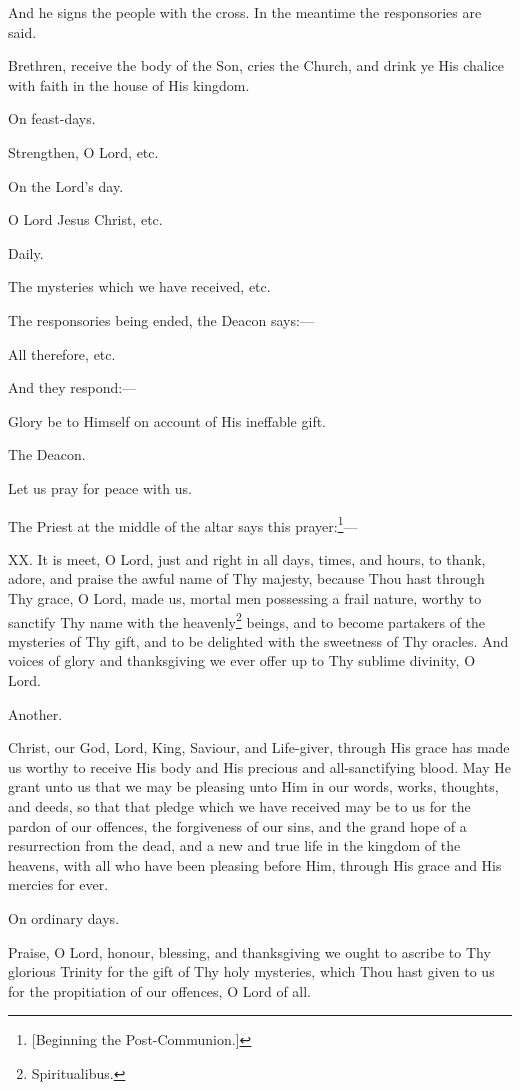 And he signs the people with the cross. In the meantime the responsories are said.

Brethren, receive the body of the Son, cries the Church, and drink ye His chalice with faith in the house of His kingdom.

On feast-days.

Strengthen, O Lord, etc.

On the Lord’s day.

O Lord Jesus Christ, etc.

Daily.

The mysteries which we have received, etc.

The responsories being ended, the Deacon says:—

All therefore, etc.

And they respond:—

Glory be to Himself on account of His ineffable gift.

The Deacon.

Let us pray for peace with us.

The Priest at the middle of the altar says this prayer:\footnote{\par{}  [Beginning the Post-Communion.]}—

XX. It is meet, O Lord, just and right in all days, times, and hours, to thank, adore, and praise the awful name of Thy majesty, because Thou hast through Thy grace, O Lord, made us, mortal men possessing a frail nature, worthy to sanctify Thy name with the heavenly\footnote{\par  Spiritualibus.} beings, and to become partakers of the mysteries of Thy gift, and to be delighted with the sweetness of Thy oracles. And voices of glory and thanksgiving we ever offer up to Thy sublime divinity, O Lord.

Another.

Christ, our God, Lord, King, Saviour, and Life-giver, through His grace has made us worthy to receive His body and His precious and all-sanctifying blood. May He grant unto us that we may be pleasing unto Him in our words, works, thoughts, and deeds, so that that pledge which we have received may be to us for the pardon of our offences, the forgiveness of our sins, and the grand hope of a resurrection from the dead, and a new and true life in the kingdom of the heavens, with all who have been pleasing before Him, through His grace and His mercies for ever.

On ordinary days.

Praise, O Lord, honour, blessing, and thanksgiving we ought to ascribe to Thy glorious Trinity for the gift of Thy holy mysteries, which Thou hast given to us for the propitiation of our offences, O Lord of all.

